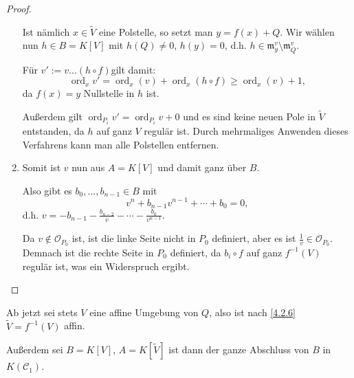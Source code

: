 \documentclass[a4paper,12pt,index=toc]{scrbook}
\theoremstyle{keinenummern} %
\def\CC{\mathcal{C}}
\def\O{\mathcal{O}}
\def\m{\mathfrak{m}}
\newcommand{\ord}{\operatorname{ord}}
\renewcommand{\dotsc}{\ensuremath{\!...}}
\newcommand{\schlange}[1]{\widetilde{#1}}
\begin{document}
\begin{proof}
\begin{prooflist}
\begin{enumerate}
Ist nämlich $x\in \schlange{V}$ eine Polstelle, so setzt man $y=f(x)+Q$. Wir wählen nun $h\in B=K[V]$ mit $h(Q)\neq 0$, $h(y)=0$, d.h. $h\in \m_y^v\setminus \m_Q^v$. 

Für $v':=v\dotsc (h\circ f)$gilt damit:
\begin{equation*}\ord_x v'=\ord_x (v)+\ord_x (h\circ f)\ge \ord_ x (v) +1,\end{equation*}
da $f(x)=y$ Nullstelle in $h$ ist.

Außerdem gilt $\ord_{P_i} v'=\ord_{P_i} v+0$ und es sind keine neuen Pole in $\schlange{V}$ entstanden, da $h$ auf ganz $V$ regulär ist. Durch mehrmaliges Anwenden dieses Verfahrens kann man alle Polstellen entfernen.
\item \hypertarget{ganzpolstelle}{Somit ist $v$ nun aus $A=K[V]$ und damit ganz über $B$.}

 Also gibt es $b_0,\dotsc,b_{n-1} \in B$ mit \begin{equation*}v^n+b_{n-1}v^{n-1}+\dotsm+b_0=0,\end{equation*}d.h. $v=-b_{n-1}-\frac{b_{n-2}}{v}-\dotsm-\frac{b_0}{v^{n-1}}$.

Da $v\notin \O_{P_0}$ ist, ist die linke Seite nicht in $P_0$ definiert, aber es ist $\frac{1}{v}\in \O_{P_0}$. Demnach ist die rechte Seite in $P_0$ definiert, da $b_i\circ f$ auf ganz $f^{-1}(V)$ regulär ist, was ein Widerspruch ergibt.
\end{enumerate}
\end{prooflist}\end{proof}

\begin{w} Ab jetzt sei stets $V$ eine affine Umgebung von $Q$, also ist nach \cref{4.2.6} $\schlange{V}=f^{-1}(V)$ affin.

Außerdem sei $B=K[V]$, $A=K[\schlange{V}]$ ist dann der ganze Abschluss von $B$ in $K(\CC_1)$.
\end{w}
\end{document}
